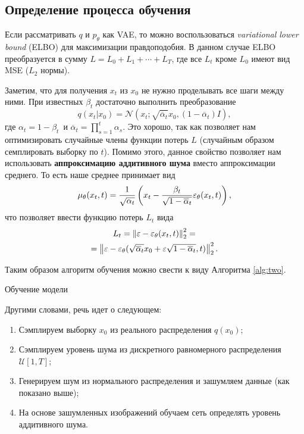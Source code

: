 \documentclass[11pt, a4paper, twocolumn, twoside]{article} %
\begin{document}
\subsection{Определение процесса обучения}

Если рассматривать $q$ и $p_{\theta}$ как VAE, то можно воспользоваться \textit{variational lower bound} (ELBO) для максимизации правдоподобия. В данном случае ELBO преобразуется в сумму $L = L_0 + L_1 + \cdots + L_T$, где все $L_t$ кроме $L_0$ имеют вид MSE ($L_2$ нормы).

Заметим, что для получения $x_t$ из $x_0$ не нужно проделывать все шаги между ними. При известных $\beta_t$ достаточно выполнить преобразование 
\begin{equation}
	q(x_t | x_0) = \mathcal{N}(x_t; \sqrt{\overline\alpha_t}x_0, (1-\overline\alpha_t)I),
\end{equation}
где $\alpha_t = 1 - \beta_t$ и $\overline\alpha_t = \prod_{s=1}^t \alpha_s$. Это хорошо, так как позволяет нам оптимизировать случайные члены функции потерь $L$ (случайным образом семплировать выборку по $t$). Помимо этого, данное свойство позволяет нам использовать \textbf{аппроксимацию аддитивного шума} вместо аппроксимации среднего. То есть наше среднее принимает вид
\begin{equation}
	\mu_{\theta}(x_t, t) = \dfrac{1}{\sqrt{\alpha_t}}\left( x_t - \dfrac{\beta_t}{\sqrt{1 - \overline\alpha_t}}\varepsilon_\theta(x_t, t) \right),
\end{equation}
что позволяет ввести функцию потерь $L_t$ вида
\begin{multline}
	L_t = \left\Vert \varepsilon - \varepsilon_\theta(x_t, t) \right\Vert_2^2 = \\ = \left\Vert \varepsilon - \varepsilon_\theta(\sqrt{\overline\alpha_t}x_0 + \varepsilon\sqrt{1-\overline\alpha_t}, t) \right\Vert_2^2.
\end{multline}

Таким образом алгоритм обучения можно свести к виду Алгоритма \ref{alg:two}.
\begin{algorithm}
\caption{Обучение модели}\label{alg:two}
\end{algorithm}

Другими словами, речь идет о следующем:
\begin{enumerate}
  \item Сэмплируем выборку $x_0$ из реального распределения $q(x_0)$;
  \item Сэмплируем уровень шума из дискретного равномерного распределения $\mathcal{U}[1, T]$;
  \item Генерируем шум из нормального распределения и зашумляем данные (как показано выше);
  \item На основе зашумленных изображений обучаем сеть определять уровень аддитивного шума.
\end{enumerate}
\end{document}
